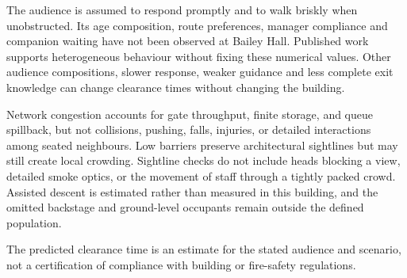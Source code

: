 \documentclass[11pt,a4paper]{article}
\begin{document}
The audience is assumed to respond promptly and to walk briskly when unobstructed. Its age composition, route preferences, manager compliance and companion waiting have not been observed at Bailey Hall. Published work supports heterogeneous behaviour without fixing these numerical values. Other audience compositions, slower response, weaker guidance and less complete exit knowledge can change clearance times without changing the building.

Network congestion accounts for gate throughput, finite storage, and queue spillback, but not collisions, pushing, falls, injuries, or detailed interactions among seated neighbours. Low barriers preserve architectural sightlines but may still create local crowding. Sightline checks do not include heads blocking a view, detailed smoke optics, or the movement of staff through a tightly packed crowd. Assisted descent is estimated rather than measured in this building, and the omitted backstage and ground-level occupants remain outside the defined population.

The predicted clearance time is an estimate for the stated audience and scenario, not a certification of compliance with building or fire-safety regulations.
\end{document}
